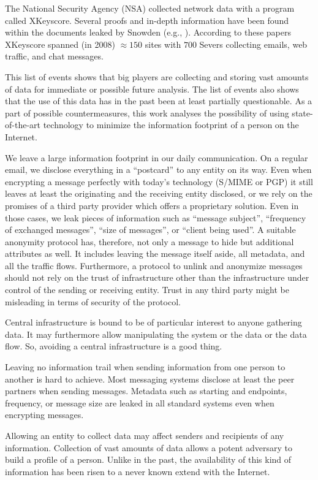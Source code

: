 \documentclass[10pt,journal,compsoc]{IEEEtran}
\begin{document}
The National Security Agency (NSA) collected network data with a program called XKeyscore. Several proofs and in-depth information have been found within the documents leaked by Snowden (e.g., \cite{XKeyscore}). According to these papers XKeyscore spanned (in 2008) $\approx150$ sites with $700$ Severs collecting emails, web traffic, and chat messages.

This list of events shows that big players are collecting and storing vast amounts of data for immediate or possible future analysis. The list of events also shows that the use of this data has in the past been at least partially questionable. As a part of possible countermeasures, this work analyses the possibility of using state-of-the-art technology to minimize the information footprint of a person on the Internet. 

We leave a large information footprint in our daily communication. On a regular email, we disclose everything in a ``postcard'' to any entity on its way. Even when encrypting a message perfectly with today's technology (S/MIME\cite{RFC2045} or PGP\cite{RFC2015}) it still leaves at least the originating and the receiving entity disclosed, or we rely on the promises of a third party provider which offers a proprietary solution. Even in those cases, we leak pieces of information such as ``message subject'', ``frequency of exchanged messages'', ``size of messages'', or ``client being used''. A suitable anonymity protocol has, therefore, not only a message to hide but additional attributes as well. It includes leaving the message itself aside, all metadata, and all the traffic flows. Furthermore, a protocol to unlink and anonymize messages should not rely on the trust of infrastructure other than the infrastructure under control of the sending or receiving entity. Trust in any third party might be misleading in terms of security of the protocol.

Central infrastructure is bound to be of particular interest to anyone gathering data. It may furthermore allow manipulating the system or the data or the data flow. So, avoiding a central infrastructure is a good thing.

Leaving no information trail when sending information from one person to another is hard to achieve. Most messaging systems disclose at least the peer partners when sending messages. Metadata such as starting and endpoints, frequency, or message size are leaked in all standard systems even when encrypting messages.

Allowing an entity to collect data may affect senders and recipients of any information. Collection of vast amounts of data allows a potent adversary to build a  profile of a person. Unlike in the past, the availability of this kind of information has been risen to a never known extend with the Internet.
\end{document}
